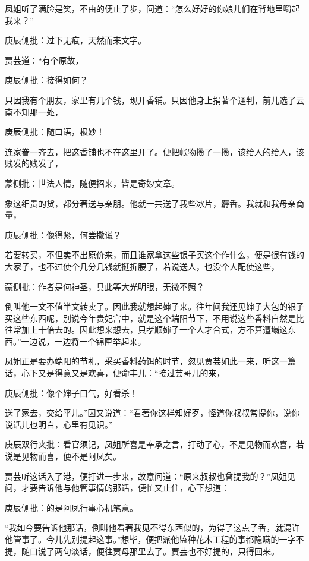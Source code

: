 \begin{parag}
    凤姐听了满脸是笑，不由的便止了步，问道：“怎么好好的你娘儿们在背地里嚼起我来？”\begin{note}庚辰侧批：过下无痕，天然而来文字。\end{note}贾芸道：“有个原故，\begin{note}庚辰侧批：接得如何？\end{note}只因我有个朋友，家里有几个钱，现开香铺。只因他身上捐著个通判，前儿选了云南不知那一处，\begin{note}庚辰侧批：随口语，极妙！\end{note}连家眷一齐去，把这香铺也不在这里开了。便把帐物攒了一攒，该给人的给人，该贱发的贱发了，\begin{note}蒙侧批：世法人情，随便招来，皆是奇妙文章。\end{note}象这细贵的货，都分著送与亲朋。他就一共送了我些冰片，麝香。我就和我母亲商量，\begin{note}庚辰侧批：像得紧，何尝撒谎？\end{note}若要转买，不但卖不出原价来，而且谁家拿这些银子买这个作什么，便是很有钱的大家子，也不过使个几分几钱就挺折腰了，若说送人，也没个人配使这些，\begin{note}蒙侧批：作者是何神圣，具此等大光明眼，无微不照？\end{note}倒叫他一文不值半文转卖了。因此我就想起婶子来。往年间我还见婶子大包的银子买这些东西呢，别说今年贵妃宫中，就是这个端阳节下，不用说这些香料自然是比往常加上十倍去的。因此想来想去，只孝顺婶子一个人才合式，方不算遭塌这东西。”一边说，一边将一个锦匣举起来。
\end{parag}


\begin{parag}
    凤姐正是要办端阳的节礼，采买香料药饵的时节，忽见贾芸如此一来，听这一篇话，心下又是得意又是欢喜，便命丰儿：“接过芸哥儿的来，\begin{note}庚辰侧批：像个婶子口气，好看杀！\end{note}送了家去，交给平儿。”因又说道：“看著你这样知好歹，怪道你叔叔常提你，说你说话儿也明白，心里有见识。”\begin{note}庚辰双行夹批：看官须记，凤姐所喜是奉承之言，打动了心，不是见物而欢喜，若说是见物而喜，便不是阿凤矣。\end{note}贾芸听这话入了港，便打进一步来，故意问道：“原来叔叔也曾提我的？”凤姐见问，才要告诉他与他管事情的那话，便忙又止住，心下想道：\begin{note}庚辰侧批：的是阿凤行事心机笔意。\end{note}“我如今要告诉他那话，倒叫他看著我见不得东西似的，为得了这点子香，就混许他管事了。今儿先别提起这事。”想毕，便把派他监种花木工程的事都隐瞒的一字不提，随口说了两句淡话，便往贾母那里去了。贾芸也不好提的，只得回来。
\end{parag}


